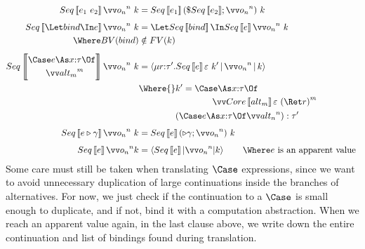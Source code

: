 \documentclass{article}
\begin{document}
\begin{align*}
  Seq\trans{\expr_1 ~ \expr_2} \vect[n]{\frm_n}  ~ \ko
  &=
  Seq\trans{\expr_1} (\appto{Seq\trans{\expr_2}};\vect[n]{\frm_n}) ~ \ko
  \\[1ex]
  Seq\trans{\Let \abind \In \expr} \vect[n]{\frm_n} ~ \ko
  &=
  \Let Seq\trans{\abind} \In Seq\trans{\expr} \vect[n]{\frm_n} ~ \ko
  \\
  \Where
    BV(\abind) &\notin FV(\ko)
  \\[1ex]
  Seq\trans{
  \begin{aligned}
   &\Case \expr \As \ann{x}{\ty} \Of
   \\
   &\qquad
   \vect[m]{\analt_m} 
  \end{aligned}
  }
  \vect[n]{\frm_n} ~ \ko
  &=
  \Braket
    { \comp{\ann{r}{\ty'}} Seq\trans{\expr} \mt ~ \ko'
    | \vect[n]{\frm_n}
    | \ko }
  \\ &
  \Where{}
    \ko' =
       \begin{aligned}[t]
         &
         \Case \As \ann{x}{\ty} \Of
         \\
         &\qquad
         \vect[m]{Core\trans{\analt_m} \mt ~ (\ret r)}
       \end{aligned}
  \\ & \phantom{\Where{}}
    (\Case \expr \As \ann{x}{\ty} \Of \vect[n]{\analt_n}) : \ty'
  \\[1ex]
  Seq\trans{\coerce{\expr}{\cn}} \vect[n]{\frm_n} ~ \ko
  &=
  Seq\trans{\expr} (\castby{\cn} \then \vect[n]{\frm_n}) ~ \ko
  \\[1ex]
  Seq\trans{\expr} \vect[n]{\frm_n} \ko
  &=
  \braket{Seq\trans{\expr} | \vect[n]{\frm_n} | \ko}
  \qquad
  \Where
    \expr \text{ is an apparent value }
\end{align*}
Some care must still be taken when translating $\Case$ expressions, since we want
to avoid unnecessary duplication of large continuations inside the branches of
alternatives.  For now, we just check if the continuation to a $\Case$ is small
enough to duplicate, and if not, bind it with a computation abstraction.  When
we reach an apparent value again, in the last clause above, we write down the
entire continuation and list of bindings found during translation.
\end{document}
